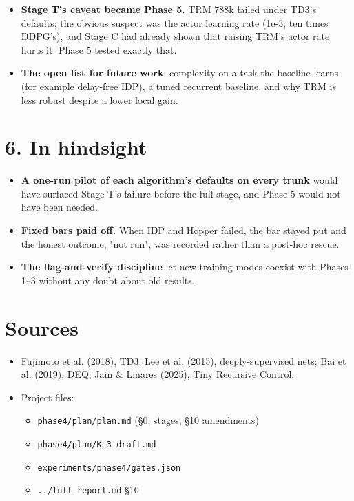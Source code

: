 \documentclass[11pt]{article}
\begin{document}
\begin{itemize}
\item \textbf{Stage T's caveat became Phase 5.} TRM 788k failed under TD3's defaults; the obvious suspect was the actor learning rate (1e-3, ten times DDPG's), and Stage C had already shown that raising TRM's actor rate hurts it. Phase 5 tested exactly that.
\item \textbf{The open list for future work}: complexity on a task the baseline learns (for example delay-free IDP), a tuned recurrent baseline, and why TRM is less robust despite a lower local gain.
\end{itemize}



\section*{6. In hindsight}



\begin{itemize}
\item \textbf{A one-run pilot of each algorithm's defaults on every trunk} would have surfaced Stage T's failure before the full stage, and Phase 5 would not have been needed.
\item \textbf{Fixed bars paid off.} When IDP and Hopper failed, the bar stayed put and the honest outcome, "not run", was recorded rather than a post-hoc rescue.
\item \textbf{The flag-and-verify discipline} let new training modes coexist with Phases 1--3 without any doubt about old results.
\end{itemize}



\section*{Sources}



\begin{itemize}
\item Fujimoto et al. (2018), TD3; Lee et al. (2015), deeply-supervised nets; Bai et al. (2019), DEQ; Jain \& Linares (2025), Tiny Recursive Control.
\item Project files:
\begin{itemize}
\item \texttt{phase4/\allowbreak{}plan/\allowbreak{}plan.\allowbreak{}md} (\S{}0, stages, \S{}10 amendments)
\item \texttt{phase4/\allowbreak{}plan/\allowbreak{}K-3\_\allowbreak{}draft.\allowbreak{}md}
\item \texttt{experiments/\allowbreak{}phase4/\allowbreak{}gates.\allowbreak{}json}
\item \texttt{.\allowbreak{}.\allowbreak{}/\allowbreak{}full\_\allowbreak{}report.\allowbreak{}md} \S{}10
\end{itemize}
\end{itemize}
\end{document}
